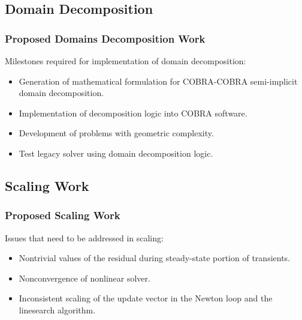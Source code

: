 \documentclass[compress,xcolor=table]{beamer}
\begin{document}
\subsection[Domain Decomposition]{Domain Decomposition}
\begin{frame}
\frametitle{Proposed Domains Decomposition Work}

Milestones required for implementation of domain decomposition:

\begin{itemize}
\item{Generation of mathematical formulation for COBRA-COBRA semi-implicit domain decomposition.}
\item{Implementation of decomposition logic into COBRA software.}
\item{Development of problems with geometric complexity.}
\item{Test legacy solver using domain decomposition logic.} 
\end{itemize}

\end{frame}
\subsection[Scaling]{Scaling Work}
\begin{frame}
\frametitle{Proposed Scaling Work}

Issues that need to be addressed in scaling:
\begin{itemize}
\item{Nontrivial values of the residual during steady-state portion of transients.}
\item{Nonconvergence of nonlinear solver.}
\item{Inconsistent scaling of the update vector in the Newton loop and the linesearch algorithm.} 
\end{itemize}

\end{frame}
\end{document}
